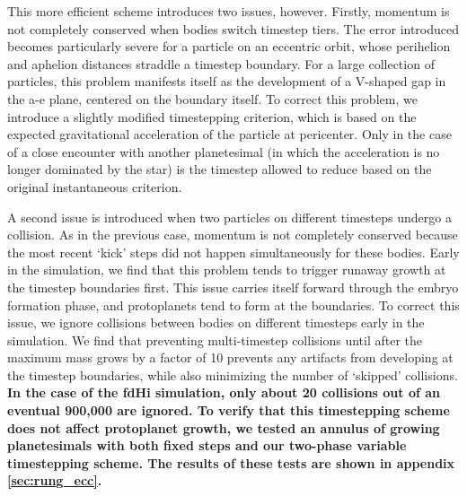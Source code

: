 \documentclass[twocolumn,linenumbers]{aastex63}
\begin{document}
This more efficient scheme introduces two issues, however. Firstly,
momentum is not completely conserved when bodies switch timestep tiers. The
error introduced becomes particularly severe for a particle on an
eccentric orbit, whose perihelion and aphelion distances
straddle a timestep boundary. For a large collection of particles,
this problem manifests itself as the development of a V-shaped gap in the a-e plane, centered on the boundary itself. To correct this problem, we introduce a slightly modified timestepping criterion, which is based on the expected gravitational acceleration of the particle at pericenter. Only in the case of a close encounter with another planetesimal (in which the acceleration is no longer dominated by the star) is the timestep allowed to reduce based on the original instantaneous criterion.

A second issue is introduced when two particles on different timesteps
undergo a collision. As in the previous case, momentum is not
completely conserved because the most recent `kick' steps did not
happen simultaneously for these bodies. Early in the simulation, we
find that this problem tends to trigger runaway growth at the timestep
boundaries first. This issue carries itself forward through the embryo
formation phase, and protoplanets tend to form at the boundaries. To
correct this issue, we ignore collisions between bodies on different
timesteps early in the simulation. We find that preventing
multi-timestep collisions until after the maximum mass grows by a
factor of 10 prevents any artifacts from developing at the timestep
boundaries, while also minimizing the number of `skipped' collisions. \textbf{In the case of the fdHi simulation, only about 20 collisions out of an eventual 900,000 are ignored. To verify that this timestepping scheme does not affect protoplanet growth, we tested an annulus of growing planetesimals with both fixed steps and our two-phase variable timestepping scheme. The results of these tests are shown in appendix \ref{sec:rung_ecc}.}
\end{document}
